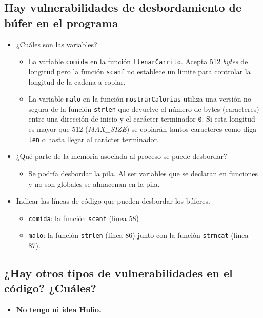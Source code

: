 \documentclass[10pt,a4paper]{article}
\begin{document}
\subsection{Hay vulnerabilidades de desbordamiento de búfer en el programa}
\begin{itemize}
\item ¿Cuáles son las variables?
	\begin{itemize}
	\item La variable \texttt{comida} en la función \texttt{llenarCarrito}. Acepta 512 \emph{bytes} de longitud pero la función \texttt{scanf} no establece un límite para controlar la longitud de la cadena a copiar.
	\item La variable \texttt{malo} en la función \texttt{mostrarCalorias} utiliza una versión no segura de la función \texttt{strlen} que devuelve el número de bytes (caracteres) entre una dirección de inicio y el carácter terminador \texttt{0}. Si esta longitud es mayor que 512 (\emph{MAX\_{}SIZE}) se copiarán tantos caracteres como diga \texttt{len} o hasta llegar al carácter terminador.
	\end{itemize}
\item ¿Qué parte de la memoria asociada al proceso se puede desbordar?
	\begin{itemize}
	\item Se podría desbordar la pila. Al ser variables que se declaran en funciones y no son globales se almacenan en la pila.
	\end{itemize}
\item Indicar las líneas de código que pueden desbordar los búferes.
	\begin{itemize}
	\item \texttt{comida}: la función \texttt{scanf} (línea 58)
	\item \texttt{malo}: la función \texttt{strlen} (línea 86) junto con la función \texttt{strncat}  (línea 87).
	\end{itemize}
\end{itemize}


\subsection{¿Hay otros tipos de vulnerabilidades en el código? ¿Cuáles?}
\begin{itemize}
\item \textbf{{\Huge No tengo ni idea Hulio.}}
\end{itemize}
\end{document}
